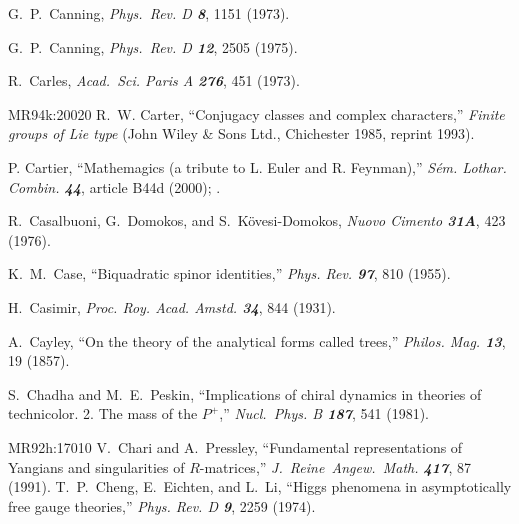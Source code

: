 G.~P.~Canning,
{\em Phys.~Rev. D \bf 8}, 1151 (1973).

G.~P.~Canning,
{\em Phys.~Rev.  D \bf 12}, 2505 (1975).


R.~Carles,
{\em Acad.~Sci. Paris  A \bf 276}, 451 (1973).

%
%
        {MR94k:20020} R.~W. Carter,
     ``Conjugacy classes and complex characters,''
     {\em Finite groups of {L}ie type}
     (John Wiley \& Sons Ltd., Chichester 1985, reprint 1993).

 P. Cartier,
    ``Mathemagics (a tribute to L. Euler and R. Feynman),''
    {\em S\'em. Lothar. Combin. \bf 44}, article B44d (2000);
     .

R.~Casalbuoni, G.~Domokos, and S.~K{\"o}vesi-Domokos,
{\em Nuovo Cimento \bf 31A}, 423 (1976).

 K.~M.~Case,
``Biquadratic spinor identities,''
{\em Phys.  Rev.   \bf 97}, 810 (1955).

 H.~Casimir,
{\em Proc.  Roy.  Acad. Amstd.  \bf 34}, 844 (1931).

 A.~Cayley,
``On the theory of the analytical forms called trees,''
{\em Philos. Mag. \bf 13}, 19 (1857). %

 S.~Chadha and M.~E.~Peskin,
``Implications of chiral dynamics in theories of technicolor. 2. The mass of
the $P^+$,''
{\em Nucl.~Phys.  B \bf 187}, 541 (1981).

        {MR92h:17010} V.~Chari and A.~Pressley,
``Fundamental representations of {Y}angians
  and singularities of {$R$}-matrices,''
{\em J.~Reine~Angew.~Math. \bf 417}, 87 (1991). %
T.~P.~Cheng, E.~Eichten, and L.~Li,
``Higgs phenomena in asymptotically free gauge theories,''
{\em Phys.  Rev.    D \bf 9}, 2259 (1974).

